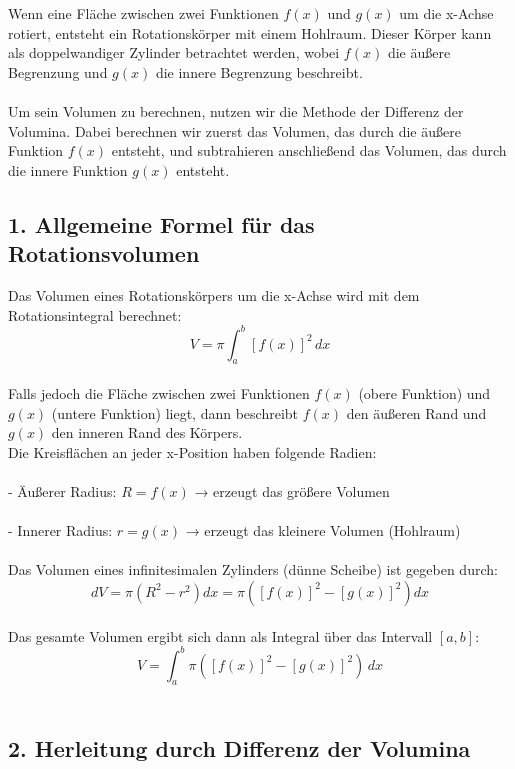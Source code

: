 \documentclass[a4paper,final]{report}
\begin{document}
Wenn eine Fläche zwischen zwei Funktionen \( f(x) \) und \( g(x) \) um die x-Achse rotiert, entsteht ein Rotationskörper mit einem Hohlraum. Dieser Körper kann als doppelwandiger Zylinder betrachtet werden, wobei \( f(x) \) die äußere Begrenzung und \( g(x) \) die innere Begrenzung beschreibt.
\\
\\
Um sein Volumen zu berechnen, nutzen wir die Methode der Differenz der Volumina. Dabei berechnen wir zuerst das Volumen, das durch die äußere Funktion \( f(x) \) entsteht, und subtrahieren anschließend das Volumen, das durch die innere Funktion \( g(x) \) entsteht.
\\
\subsection{1. Allgemeine Formel für das Rotationsvolumen}
Das Volumen eines Rotationskörpers um die x-Achse wird mit dem Rotationsintegral berechnet:
\\
\[
V = \pi \int_a^b [f(x)]^2 \, dx
\]
\\
Falls jedoch die Fläche zwischen zwei Funktionen \( f(x) \) (obere Funktion) und \( g(x) \) (untere Funktion) liegt, dann beschreibt \( f(x) \) den äußeren Rand und \( g(x) \) den inneren Rand des Körpers.
\\
Die Kreisflächen an jeder x-Position haben folgende Radien:
\\
\\- Äußerer Radius: \( R = f(x) \) → erzeugt das größere Volumen
\\
\\- Innerer Radius: \( r = g(x) \) → erzeugt das kleinere Volumen (Hohlraum)
\\
\\
Das Volumen eines infinitesimalen Zylinders (dünne Scheibe) ist gegeben durch:
\\
\[
dV = \pi (R^2 - r^2) dx = \pi \left( [f(x)]^2 - [g(x)]^2 \right) dx
\]
\\
Das gesamte Volumen ergibt sich dann als Integral über das Intervall \( [a, b] \):
\\
\[
V = \int_a^b \pi \left( [f(x)]^2 - [g(x)]^2 \right) \, dx
\]
\\
\subsection{2. Herleitung durch Differenz der Volumina}
\end{document}
